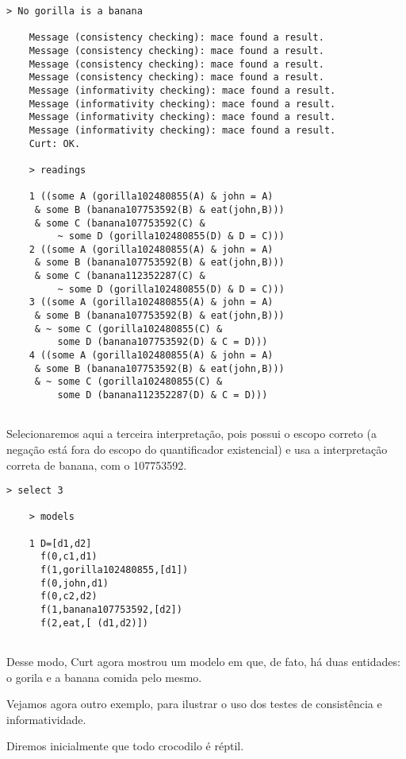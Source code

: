 	\begin{Verbatim}[fontseries=b,gobble=1]
	> No gorilla is a banana
	
	Message (consistency checking): mace found a result.
	Message (consistency checking): mace found a result.
	Message (consistency checking): mace found a result.
	Message (consistency checking): mace found a result.
	Message (informativity checking): mace found a result.
	Message (informativity checking): mace found a result.
	Message (informativity checking): mace found a result.
	Message (informativity checking): mace found a result.
	Curt: OK.
	
	> readings
	
	1 ((some A (gorilla102480855(A) & john = A)
	 & some B (banana107753592(B) & eat(john,B)))
	 & some C (banana107753592(C) &
	 	 ~ some D (gorilla102480855(D) & D = C)))
	2 ((some A (gorilla102480855(A) & john = A)
	 & some B (banana107753592(B) & eat(john,B)))
	 & some C (banana112352287(C) &
	 	 ~ some D (gorilla102480855(D) & D = C)))
	3 ((some A (gorilla102480855(A) & john = A)
	 & some B (banana107753592(B) & eat(john,B)))
	 & ~ some C (gorilla102480855(C) &
	 	 some D (banana107753592(D) & C = D)))
	4 ((some A (gorilla102480855(A) & john = A)
	 & some B (banana107753592(B) & eat(john,B)))
	 & ~ some C (gorilla102480855(C) &
	 	 some D (banana112352287(D) & C = D)))
	
	\end{Verbatim}
	
	Selecionaremos aqui a terceira interpretação, pois possui o escopo correto (a negação está fora do escopo do quantificador existencial) e usa a interpretação correta de banana, com o  107753592. 
	
	\begin{Verbatim}[fontseries=b,gobble=1]
	> select 3
	
	> models
	
	1 D=[d1,d2]
	  f(0,c1,d1)
	  f(1,gorilla102480855,[d1])
	  f(0,john,d1)
	  f(0,c2,d2)
	  f(1,banana107753592,[d2])
	  f(2,eat,[ (d1,d2)])
	
	\end{Verbatim}
	
	Desse modo, Curt agora mostrou um modelo em que, de fato, há duas entidades: o gorila  e a banana comida pelo mesmo.
	
	Vejamos agora outro exemplo, para ilustrar o uso dos testes de consistência e informatividade.
	
	Diremos inicialmente que todo crocodilo é réptil.
	
